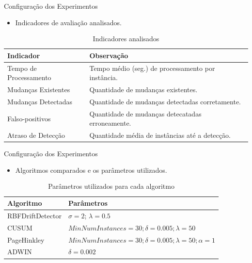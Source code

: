 \documentclass[10pt]{beamer}
\begin{document}
\begin{frame}{Configuração dos Experimentos}
    \begin{itemize}
        \item<1 -> Indicadores de avaliação analisados.
      \end{itemize}
      \begin{center} 
        \begin{table}[h]
        \resizebox{\textwidth}{!} {%
        \begin{tabular}{lm{10cm}}
        \toprule
        Indicador & Observação \\
        \midrule
        Tempo de Processamento    &  Tempo médio (seg.) de processamento por instância. \\
        Mudanças Existentes       &  Quantidade de mudanças existentes. \\
        Mudanças Detectadas       &  Quantidade de mudanças detectadas corretamente. \\
        Falso-positivos           &  Quantidade de mudanças detecatadas erroneamente. \\  
        Atraso de Detecção        &  Quantidade média de instâncias até a detecção. \\
        \bottomrule
        \end{tabular}
        }
        \caption{Indicadores analisados}
        \label{tbl:indicadores_analisado}
        \end{table}
    \end{center}
\end{frame}

\begin{frame}{Configuração dos Experimentos}
    \begin{itemize}
        \item<1 -> Algoritmos comparados e os parâmetros utilizados.
      \end{itemize}
      \begin{center} 
        \begin{table}[ht]
        \resizebox{\textwidth}{!} {%
        \begin{tabular}{lm{10cm}}
        \toprule
        Algoritmo & Parâmetros \\
        \midrule
        RBFDriftDetector          &  $\sigma = 2$; $\lambda = 0.5$ \\
        CUSUM                     &  $MinNumInstances = 30; \delta = 0.005; \lambda = 50$ \\
        PageHinkley               &  $MinNumInstances = 30; \delta = 0.005; \lambda = 50; \alpha = 1$ \\
        ADWIN                     &  $\delta = 0.002$ \\
        \bottomrule
        \end{tabular}
        }
        \caption{Parâmetros utilizados para cada algoritmo}
        \label{tbl:parametros_algoritmos}
        \end{table}
    \end{center}
\end{frame}
\end{document}
